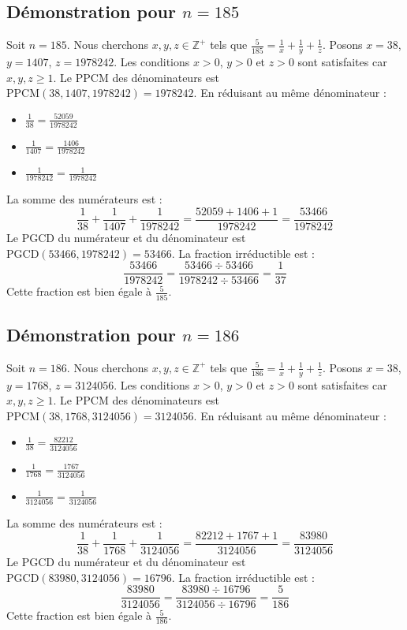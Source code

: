 \documentclass[11pt,a4paper]{article}
\begin{document}
\subsection{Démonstration pour $n = 185$}
Soit $n = 185$. Nous cherchons $x, y, z \in \mathbb{Z}^{+}$ tels que $\frac{5}{185} = \frac{1}{x} + \frac{1}{y} + \frac{1}{z}$.
Posons $x = 38$, $y = 1407$, $z = 1978242$.
Les conditions $x > 0$, $y > 0$ et $z > 0$ sont satisfaites car $x, y, z \geq 1$.
Le PPCM des dénominateurs est $\text{PPCM}(38, 1407, 1978242) = 1978242$.
En réduisant au même dénominateur :
\begin{itemize}
    \item $\frac{1}{38} = \frac{52059}{1978242}$
    \item $\frac{1}{1407} = \frac{1406}{1978242}$
    \item $\frac{1}{1978242} = \frac{1}{1978242}$
\end{itemize}
La somme des numérateurs est :
$$ \frac{1}{38} + \frac{1}{1407} + \frac{1}{1978242} = \frac{52059 + 1406 + 1}{1978242} = \frac{53466}{1978242} $$
Le PGCD du numérateur et du dénominateur est $\text{PGCD}(53466, 1978242) = 53466$.
La fraction irréductible est :
$$ \frac{53466}{1978242} = \frac{53466 \div 53466}{1978242 \div 53466} = \frac{1}{37} $$
Cette fraction est bien égale à $\frac{5}{185}$.

\subsection{Démonstration pour $n = 186$}
Soit $n = 186$. Nous cherchons $x, y, z \in \mathbb{Z}^{+}$ tels que $\frac{5}{186} = \frac{1}{x} + \frac{1}{y} + \frac{1}{z}$.
Posons $x = 38$, $y = 1768$, $z = 3124056$.
Les conditions $x > 0$, $y > 0$ et $z > 0$ sont satisfaites car $x, y, z \geq 1$.
Le PPCM des dénominateurs est $\text{PPCM}(38, 1768, 3124056) = 3124056$.
En réduisant au même dénominateur :
\begin{itemize}
    \item $\frac{1}{38} = \frac{82212}{3124056}$
    \item $\frac{1}{1768} = \frac{1767}{3124056}$
    \item $\frac{1}{3124056} = \frac{1}{3124056}$
\end{itemize}
La somme des numérateurs est :
$$ \frac{1}{38} + \frac{1}{1768} + \frac{1}{3124056} = \frac{82212 + 1767 + 1}{3124056} = \frac{83980}{3124056} $$
Le PGCD du numérateur et du dénominateur est $\text{PGCD}(83980, 3124056) = 16796$.
La fraction irréductible est :
$$ \frac{83980}{3124056} = \frac{83980 \div 16796}{3124056 \div 16796} = \frac{5}{186} $$
Cette fraction est bien égale à $\frac{5}{186}$.
\end{document}
